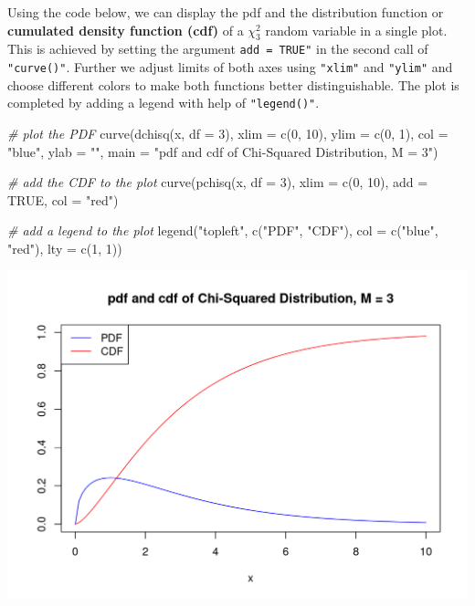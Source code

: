 \documentclass[
  14pt,
]{memoir}
\newenvironment{Shaded}{\begin{snugshade}}{\end{snugshade}}
\newcommand{\AttributeTok}[1]{\textcolor[rgb]{0.77,0.63,0.00}{#1}}
\newcommand{\CommentTok}[1]{\textcolor[rgb]{0.56,0.35,0.01}{\textit{#1}}}
\newcommand{\ConstantTok}[1]{\textcolor[rgb]{0.00,0.00,0.00}{#1}}
\newcommand{\DecValTok}[1]{\textcolor[rgb]{0.00,0.00,0.81}{#1}}
\newcommand{\FunctionTok}[1]{\textcolor[rgb]{0.00,0.00,0.00}{#1}}
\newcommand{\NormalTok}[1]{#1}
\newcommand{\StringTok}[1]{\textcolor[rgb]{0.31,0.60,0.02}{#1}}
\begin{document}
Using the code below, we can display the pdf and the distribution function or \textbf{cumulated density function (cdf)} of a \(\chi^2_3\) random variable in a single plot. This is achieved by setting the argument \texttt{add\ =\ TRUE"} in the second call of \texttt{"curve()"}. Further we adjust limits of both axes using \texttt{"xlim"} and \texttt{"ylim"} and choose different colors to make both functions better distinguishable. The plot is completed by adding a legend with help of \texttt{"legend()"}.

\begin{Shaded}
\begin{Highlighting}[]
\CommentTok{\# plot the PDF}
\FunctionTok{curve}\NormalTok{(}\FunctionTok{dchisq}\NormalTok{(x, }\AttributeTok{df =} \DecValTok{3}\NormalTok{), }
      \AttributeTok{xlim =} \FunctionTok{c}\NormalTok{(}\DecValTok{0}\NormalTok{, }\DecValTok{10}\NormalTok{), }
      \AttributeTok{ylim =} \FunctionTok{c}\NormalTok{(}\DecValTok{0}\NormalTok{, }\DecValTok{1}\NormalTok{), }
      \AttributeTok{col =} \StringTok{"blue"}\NormalTok{,}
      \AttributeTok{ylab =} \StringTok{""}\NormalTok{,}
      \AttributeTok{main =} \StringTok{"pdf and cdf of Chi{-}Squared Distribution, M = 3"}\NormalTok{)}

\CommentTok{\# add the CDF to the plot}
\FunctionTok{curve}\NormalTok{(}\FunctionTok{pchisq}\NormalTok{(x, }\AttributeTok{df =} \DecValTok{3}\NormalTok{), }
      \AttributeTok{xlim =} \FunctionTok{c}\NormalTok{(}\DecValTok{0}\NormalTok{, }\DecValTok{10}\NormalTok{), }
      \AttributeTok{add =} \ConstantTok{TRUE}\NormalTok{, }
      \AttributeTok{col =} \StringTok{"red"}\NormalTok{)}

\CommentTok{\# add a legend to the plot}
\FunctionTok{legend}\NormalTok{(}\StringTok{"topleft"}\NormalTok{, }
       \FunctionTok{c}\NormalTok{(}\StringTok{"PDF"}\NormalTok{, }\StringTok{"CDF"}\NormalTok{), }
       \AttributeTok{col =} \FunctionTok{c}\NormalTok{(}\StringTok{"blue"}\NormalTok{, }\StringTok{"red"}\NormalTok{), }
       \AttributeTok{lty =} \FunctionTok{c}\NormalTok{(}\DecValTok{1}\NormalTok{, }\DecValTok{1}\NormalTok{))}
\end{Highlighting}
\end{Shaded}

\begin{center}\includegraphics[width=0.8\linewidth]{figure/minimal-unnamed-chunk-47-1} \end{center}
\end{document}
